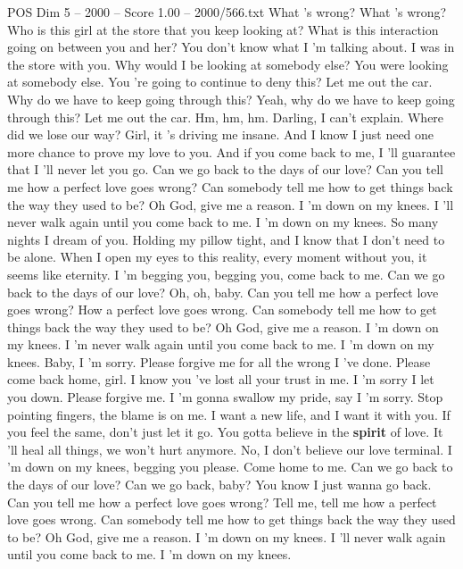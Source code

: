\begin{textsample}{POS Dim 5 – 2000 – Score 1.00 – 2000/566.txt}  \label{ex:f5_pos_016}
What 's wrong?
What 's wrong?
Who is this girl at the store that you keep looking at?
What is this interaction going on between you and her?
You don't know what I 'm talking about.
I was in the store with you.
Why would I be looking at somebody else?
You were looking at somebody else.
You 're going to continue to deny this?
Let me out the car.
Why do we have to keep going through this?
Yeah, why do we have to keep going through this?
Let me out the car.
Hm, hm, hm.
Darling, I can't explain.
Where did we lose our way?
Girl, it 's driving me insane.
And I know I just need one more chance to prove my love to you.
And if you come back to me, I 'll guarantee that I 'll never let you go.
Can we go back to the days of our love?
Can you tell me how a perfect love goes wrong?
Can somebody tell me how to get things back the way they used to be?
Oh God, give me a reason.
I 'm down on my knees.
I 'll never walk again until you come back to me.
I 'm down on my knees.
So many nights I dream of you.
Holding my pillow tight, and I know that I don't need to be alone.
When I open my eyes to this reality, every moment without you, it seems like eternity.
I 'm begging you, begging you, come back to me.
Can we go back to the days of our love?
Oh, oh, baby.
Can you tell me how a perfect love goes wrong?
How a perfect love goes wrong.
Can somebody tell me how to get things back the way they used to be?
Oh God, give me a reason.
I 'm down on my knees.
I 'm never walk again until you come back to me.
I 'm down on my knees.
Baby, I 'm sorry.
Please forgive me for all the wrong I 've done.
Please come back home, girl.
I know you 've lost all your trust in me.
I 'm sorry I let you down.
Please forgive me.
I 'm gonna swallow my pride, say I 'm sorry.
Stop pointing fingers, the blame is on me.
I want a new life, and I want it with you.
If you feel the same, don't just let it go.
You gotta believe in the \textbf{spirit} of love.
It 'll heal all things, we won't hurt anymore.
No, I don't believe our love terminal.
I 'm down on my knees, begging you please.
Come home to me.
Can we go back to the days of our love?
Can we go back, baby?
You know I just wanna go back.
Can you tell me how a perfect love goes wrong?
Tell me, tell me how a perfect love goes wrong.
Can somebody tell me how to get things back the way they used to be?
Oh God, give me a reason.
I 'm down on my knees.
I 'll never walk again until you come back to me.
I 'm down on my knees.

\end{textsample}
